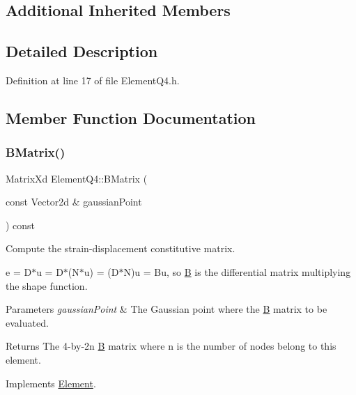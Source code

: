 \subsection*{Additional Inherited Members}


\subsection{Detailed Description}


Definition at line 17 of file Element\+Q4.\+h.



\subsection{Member Function Documentation}
\mbox{\label{class_element_q4_a092a9584a1b3b22cd929246ba100f91a}} 
\subsubsection{\texorpdfstring{B\+Matrix()}{BMatrix()}}
{\footnotesize\ttfamily Matrix\+Xd Element\+Q4\+::\+B\+Matrix (\begin{DoxyParamCaption}\item[{const Vector2d \&}]{gaussian\+Point }\end{DoxyParamCaption}) const\hspace{0.3cm}{\ttfamily [virtual]}}



Compute the strain-\/displacement constitutive matrix. 

e = D$\ast$u = D$\ast$(N$\ast$u) = (D$\ast$N)u = Bu, so \mbox{\hyperlink{class_b}{B}} is the differential matrix multiplying the shape function.


\begin{DoxyParams}{Parameters}
{\em gaussian\+Point} & The Gaussian point where the \mbox{\hyperlink{class_b}{B}} matrix to be evaluated. \\
\hline
\end{DoxyParams}
\begin{DoxyReturn}{Returns}
The 4-\/by-\/2n \mbox{\hyperlink{class_b}{B}} matrix where n is the number of nodes belong to this element. 
\end{DoxyReturn}


Implements \mbox{\hyperlink{class_element_ae3c88315d1a30addff6379a9089465ca}{Element}}.



